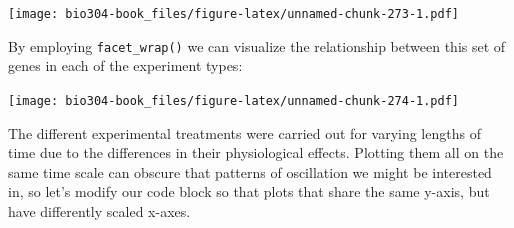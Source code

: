 \documentclass[]{book}
\newenvironment{Shaded}{\begin{snugshade}}{\end{snugshade}}
\newcommand{\CharTok}[1]{\textcolor[rgb]{0.31,0.60,0.02}{#1}}
\newcommand{\DataTypeTok}[1]{\textcolor[rgb]{0.13,0.29,0.53}{#1}}
\newcommand{\KeywordTok}[1]{\textcolor[rgb]{0.13,0.29,0.53}{\textbf{#1}}}
\newcommand{\NormalTok}[1]{#1}
\newcommand{\OperatorTok}[1]{\textcolor[rgb]{0.81,0.36,0.00}{\textbf{#1}}}
\newcommand{\StringTok}[1]{\textcolor[rgb]{0.31,0.60,0.02}{#1}}
\theoremstyle{definition}
\theoremstyle{definition}
\theoremstyle{definition}
\theoremstyle{remark}
\begin{document}
\texttt{[image: bio304-book\_files/figure-latex/unnamed-chunk-273-1.pdf]}

By employing \texttt{facet\_wrap()} we can visualize the relationship
between this set of genes in each of the experiment types:

\begin{Shaded}
\end{Shaded}

\texttt{[image: bio304-book\_files/figure-latex/unnamed-chunk-274-1.pdf]}

The different experimental treatments were carried out for varying
lengths of time due to the differences in their physiological effects.
Plotting them all on the same time scale can obscure that patterns of
oscillation we might be interested in, so let's modify our code block so
that plots that share the same y-axis, but have differently scaled
x-axes.

\begin{Shaded}
\end{Shaded}
\end{document}
